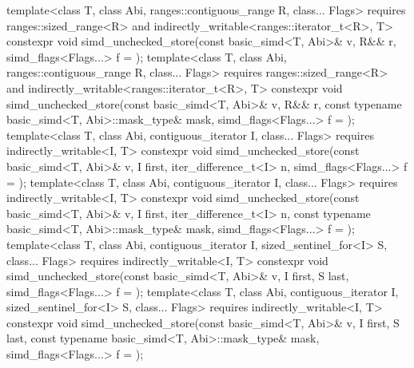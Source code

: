 \begin{itemdecl}
template<class T, class Abi, ranges::contiguous_range R, class... Flags>
  requires ranges::sized_range<R> and indirectly_writable<ranges::iterator_t<R>, T>
  constexpr void simd_unchecked_store(const basic_simd<T, Abi>& v, R&& r, simd_flags<Flags...> f = {});
template<class T, class Abi, ranges::contiguous_range R, class... Flags>
  requires ranges::sized_range<R> and indirectly_writable<ranges::iterator_t<R>, T>
  constexpr void simd_unchecked_store(const basic_simd<T, Abi>& v, R&& r,
                          const typename basic_simd<T, Abi>::mask_type& mask,
                          simd_flags<Flags...> f = {});
template<class T, class Abi, contiguous_iterator I, class... Flags>
  requires indirectly_writable<I, T>
  constexpr void simd_unchecked_store(const basic_simd<T, Abi>& v, I first, iter_difference_t<I> n,
                          simd_flags<Flags...> f = {});
template<class T, class Abi, contiguous_iterator I, class... Flags>
  requires indirectly_writable<I, T>
  constexpr void simd_unchecked_store(const basic_simd<T, Abi>& v, I first, iter_difference_t<I> n,
                          const typename basic_simd<T, Abi>::mask_type& mask,
                          simd_flags<Flags...> f = {});
template<class T, class Abi, contiguous_iterator I, sized_sentinel_for<I> S, class... Flags>
  requires indirectly_writable<I, T>
  constexpr void simd_unchecked_store(const basic_simd<T, Abi>& v, I first, S last, simd_flags<Flags...> f = {});
template<class T, class Abi, contiguous_iterator I, sized_sentinel_for<I> S, class... Flags>
  requires indirectly_writable<I, T>
  constexpr void simd_unchecked_store(const basic_simd<T, Abi>& v, I first, S last,
                          const typename basic_simd<T, Abi>::mask_type& mask,
                          simd_flags<Flags...> f = {});
\end{itemdecl}
